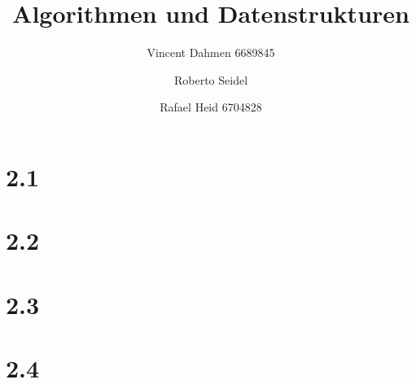 \documentclass[12pt,a4paper]{article}
\title{Algorithmen und Datenstrukturen}
\author{Vincent Dahmen 6689845\and Roberto Seidel \and Rafael Heid 6704828}
\begin{document}
\maketitle{}


\section*{2.1}


\section*{2.2}


\section*{2.3}


\section*{2.4}

\end{document}
